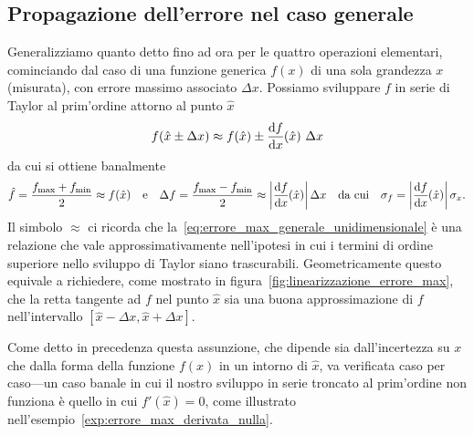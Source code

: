 \subsection{Propagazione dell'errore nel caso generale}

Generalizziamo quanto detto fino ad ora per le quattro operazioni elementari,
cominciando dal caso di una funzione generica $f(x)$ di una sola
grandezza $x$ (misurata), con errore massimo associato $\Delta x$. Possiamo
sviluppare $f$ in serie di Taylor al prim'ordine attorno al punto $\hat{x}$
\begin{align*}
  f(\hat{x} \pm \Delta x) \approx
  f(\hat{x}) \pm \td{f}{x}{\hat{x}}\,\Delta x
\end{align*}
da cui si ottiene banalmente
\begin{align}\label{eq:errore_max_generale_unidimensionale}
  \hat{f} = \frac{f_{\max} + f_{\min}}{2} \approx f(\hat{x})
  \quad \text{e} \quad
  \Delta f = \frac{f_{\max} - f_{\min}}{2} \approx
  \abs{\td{f}{x}{\hat{x}}}\Delta x
  \quad \text{da cui} \quad
  \sigma_f = \abs{\td{f}{x}{\hat{x}}}\sigma_x.
\end{align}
Il simbolo $\approx$ ci ricorda che
la~\eqref{eq:errore_max_generale_unidimensionale}
è una relazione che vale approssimativamente nell'ipotesi in cui i termini di
ordine superiore nello sviluppo di Taylor siano trascurabili. Geometricamente
questo equivale a richiedere, come mostrato in
figura~\ref{fig:linearizzazione_errore_max}, che la retta tangente ad $f$
nel punto $\hat{x}$ sia una buona approssimazione di $f$ nell'intervallo
$[\hat{x} - \Delta x, \hat{x} + \Delta x]$.


Come detto in precedenza questa assunzione, che dipende sia dall'incertezza
su $x$ che dalla forma della funzione $f(x)$ in un intorno di $\hat{x}$, va
verificata caso per caso---un caso banale in cui il nostro sviluppo in serie
troncato al prim'ordine non funziona è quello in cui $f'(\hat{x}) = 0$, come
illustrato nell'esempio~\ref{exp:errore_max_derivata_nulla}.

